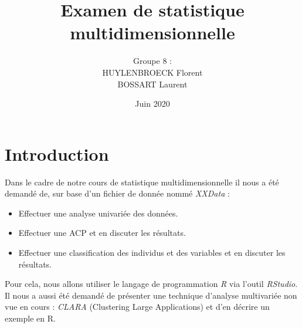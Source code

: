 \documentclass[11pt]{article}
\title{\huge Examen de statistique multidimensionnelle}
\author{Groupe 8 :\\
HUYLENBROECK Florent\\
BOSSART Laurent}
\date{Juin 2020}
\begin{document}
\maketitle
\newpage
\tableofcontents
\newpage
\section{Introduction}
Dans le cadre de notre cours de statistique multidimensionnelle il nous a été demandé de, sur base d'un fichier de donnée nommé \emph{XXData} :
\begin{itemize}
\item Effectuer une analyse univariée des données.
\item Effectuer une ACP et en discuter les résultats.
\item Effectuer une classification des individus et des variables et en discuter les résultats.
\end{itemize}
Pour cela, nous allons utiliser le langage de programmation \emph{R} via l'outil \emph{RStudio}.\\
Il nous a aussi été demandé de présenter une technique d'analyse multivariée non vue en cours : \emph{CLARA} (Clustering Large Applications) et d'en décrire un exemple en R.
\end{document}
